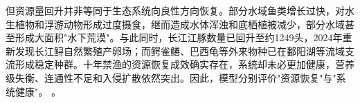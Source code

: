 但资源量回升并非等同于生态系统向良性方向恢复。部分水域鱼类增长过快，对水生植物和浮游动物形成过度摄食，继而造成水体浑浊和底栖植被减少，部分水域甚至形成大面积"水下荒漠"。与此同时，长江江豚数量已回升至约1249头，2024年重新发现长江鲟自然繁殖产卵场；而鳄雀鳝、巴西龟等外来物种已在鄱阳湖等流域支流形成稳定种群。十年禁渔的资源恢复成效确实存在，系统却未必更加健康，营养级失衡、连通性不足和入侵扩散依然突出。因此，模型分别评价"资源恢复"与"系统健康"。
\cite{report2022,report2023}。
